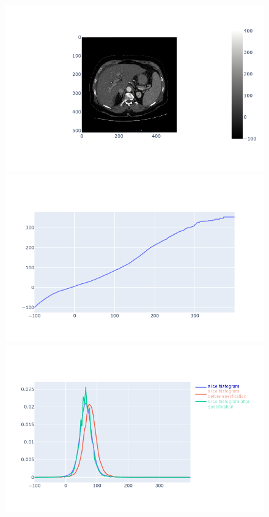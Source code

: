 \begin{figure}
\centering
\begin{minipage}{0.4\linewidth}
\includegraphics[width=\linewidth]{./images/image3.png}
\end{minipage}
\begin{minipage}{0.4\linewidth}
\includegraphics[width=\linewidth]{./images/image1.png}
\end{minipage}
\begin{minipage}{0.4\linewidth}
\includegraphics[width=\linewidth]{./images/image2_modified.png}

\end{minipage}
\end{figure}
